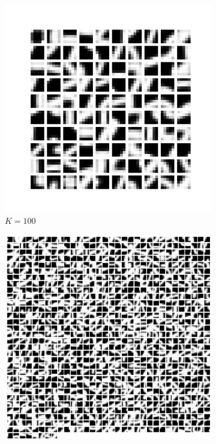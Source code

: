 \documentclass{article}
\begin{document}
\begin{figure}[htbp!]
    \centering
    \begin{subfigure}[b]{0.48\textwidth}
        \centering
        \includegraphics[width=\textwidth]{../Result/Centroids/100-clusters-centroids.png}
        \caption{$K = 100$}
        \label{fig:100-centroids}
    \end{subfigure}
    \hfill
    \begin{subfigure}[b]{0.48\textwidth}
        \centering
        \includegraphics[width=\textwidth]{../Result/Centroids/Screenshot 2024-04-19 231953.png}

\end{subfigure}
\end{figure}
\end{document}
